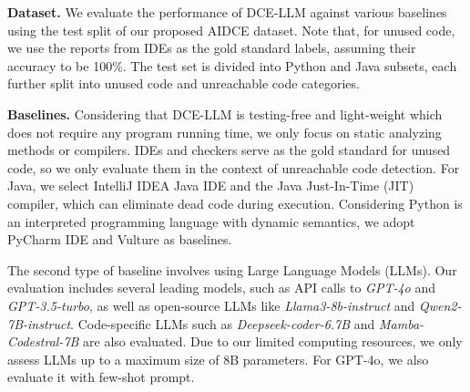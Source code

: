 \documentclass[11pt]{article}
\begin{document}

\textbf{Dataset.} We evaluate the performance of DCE-LLM against various baselines using the test split of our proposed AIDCE dataset. Note that, for unused code, we use the reports from IDEs as the gold standard labels, assuming their accuracy to be 100\%. The test set is divided into Python and Java subsets, each further split into unused code and unreachable code categories.

\noindent \textbf{Baselines.} Considering that DCE-LLM is testing-free and light-weight which does not require any program running time, we only focus on static analyzing methods or compilers. IDEs and checkers serve as the gold standard for unused code, so we only evaluate them in the context of unreachable code detection. For Java, we select IntelliJ IDEA Java IDE and the Java Just-In-Time (JIT) compiler, which can eliminate dead code during execution. Considering Python is an interpreted programming language with dynamic semantics, we adopt PyCharm IDE and Vulture as baselines.

The second type of baseline involves using Large Language Models (LLMs).
Our evaluation includes several leading models, such as API calls to \textit{GPT-4o} and \textit{GPT-3.5-turbo}, as well as open-source LLMs like \textit{Llama3-8b-instruct} and \textit{Qwen2-7B-instruct}. Code-specific LLMs such as \textit{Deepseek-coder-6.7B} and \textit{Mamba-Codestral-7B} are also evaluated.
Due to our limited computing resources, we only assess LLMs up to a maximum size of 8B parameters. For GPT-4o, we also evaluate it with few-shot prompt.
\end{document}
